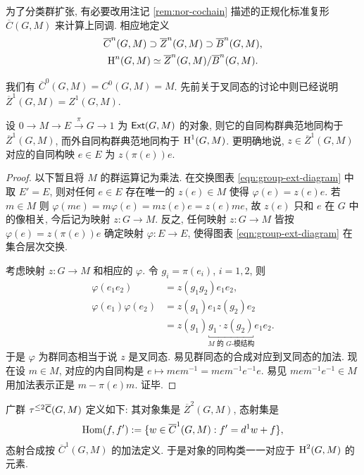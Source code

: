 为了分类群扩张, 有必要改用注记 \ref{rem:nor-cochain} 描述的正规化标准复形 $\overline{C}(G, M)$ 来计算上同调. 相应地定义
\begin{gather*}
	\overline{C}^n(G, M) \supset \overline{Z}^n(G, M) \supset \overline{B}^n(G, M), \\
	\operatorname{H}^n(G, M) \simeq \overline{Z}^n(G, M) / \overline{B}^n(G, M).
\end{gather*}

我们有 $\overline{C}^0(G, M) = C^0(G, M) = M$. 先前关于叉同态的讨论中则已经说明 $\overline{Z}^1(G, M) = Z^1(G, M)$.

\begin{lemma}\label{prop:factor-set-prep}
	设 $0 \to M \to E \xrightarrow{\pi} G \to 1$ 为 $\mathsf{Ext}(G, M)$ 的对象, 则它的自同构群典范地同构于 $\overline{Z}^1(G, M)$, 而外自同构群典范地同构于 $\operatorname{H}^1(G, M)$. 更明确地说, $z \in \overline{Z}^1(G, M)$ 对应的自同构映 $e \in E$ 为 $z(\pi(e)) e$.
\end{lemma}
\begin{proof}
	以下暂且将 $M$ 的群运算记为乘法. 在交换图表 \eqref{eqn:group-ext-diagram} 中取 $E' = E$, 则对任何 $e \in E$ 存在唯一的 $z(e) \in M$ 使得 $\varphi(e) = z(e)e$. 若 $m \in M$ 则 $\varphi(me) = m\varphi(e) = mz(e)e = z(e)me$, 故 $z(e)$ 只和 $e$ 在 $G$ 中的像相关, 今后记为映射 $z: G \to M$. 反之, 任何映射 $z: G \to M$ 皆按 $\varphi(e) = z(\pi(e)) e$ 确定映射 $\varphi: E \to E$, 使得图表 \eqref{eqn:group-ext-diagram} 在集合层次交换.
	
	考虑映射 $z: G \to M$ 和相应的 $\varphi$. 令 $g_i = \pi(e_i)$, $i=1,2$, 则
	\begin{align*}
		\varphi(e_1 e_2) & = z(g_1 g_2) e_1 e_2 , \\
		\varphi(e_1) \varphi(e_2) & = z(g_1) e_1 z(g_2) e_2 \\
		& = z(g_1) \underbracket{g_1 \cdot z(g_2)}_{\text{$M$ 的 $G$-模结构}} e_1 e_2.
	\end{align*}
	于是 $\varphi$ 为群同态相当于说 $z$ 是叉同态. 易见群同态的合成对应到叉同态的加法. 现在设 $m \in M$, 对应的内自同构是 $e \mapsto mem^{-1} = mem^{-1}e^{-1} e$. 易见 $mem^{-1}e^{-1} \in M$ 用加法表示正是 $m - \pi(e)m$. 证毕.
\end{proof}

\begin{definition}
	广群 $\tau^{\leq 2}\overline{\mathsf{C}}(G, M)$ 定义如下: 其对象集是 $\overline{Z}^2(G, M)$, 态射集是
	\[ \operatorname{Hom}(f, f') := \{w \in \overline{C}^1(G, M): f' = d^1 w + f \}, \]
	态射合成按 $\overline{C}^1(G, M)$ 的加法定义. 于是对象的同构类一一对应于 $\operatorname{H}^2(G, M)$ 的元素.
\end{definition}

